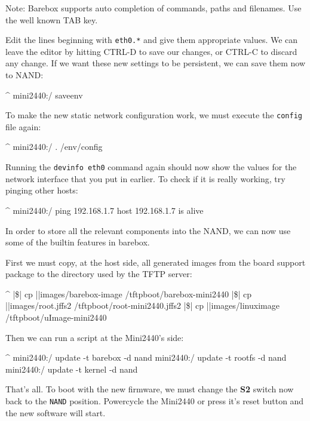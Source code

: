 Note: Barebox supports auto completion of commands, paths and filenames. Use
the well known TAB key.

Edit the lines beginning with \texttt{eth0.*} and give them appropriate values.
We can leave the editor by hitting CTRL-D to save our changes, or CTRL-C to
discard any change. If we want these new settings to be persistent, we can save
them now to NAND:

\begin{ptxshell}[escapechar=|]{^}
mini2440:/ saveenv
\end{ptxshell}

To make the new static network configuration work, we must execute the
\texttt{config} file again:

\begin{ptxshell}[escapechar=|]{^}
mini2440:/ . /env/config
\end{ptxshell}

Running the \texttt{devinfo eth0} command again should now show the values for
the network interface that you put in earlier. To check if it is really working,
try pinging other hosts:

\begin{ptxshell}[escapechar=|]{^}
mini2440:/ ping 192.168.1.7
host 192.168.1.7 is alive
\end{ptxshell}

In order to store all the relevant components into the NAND, we can now use
some of the builtin features in barebox.

First we must copy, at the host side, all generated images from the board support
package to the directory used by the TFTP server:

\begin{ptxshell}[escapechar=|]{^}
|\$| cp |\ptxdistPlatformDir |images/barebox-image /tftpboot/barebox-mini2440
|\$| cp |\ptxdistPlatformDir |images/root.jffs2 /tftpboot/root-mini2440.jffs2
|\$| cp |\ptxdistPlatformDir |images/linuximage /tftpboot/uImage-mini2440
\end{ptxshell}

Then we can run a script at the Mini2440's side:

\begin{ptxshell}[escapechar=|]{^}
mini2440:/ update -t barebox -d nand
mini2440:/ update -t rootfs -d nand
mini2440:/ update -t kernel -d nand
\end{ptxshell}

That's all. To boot with the new firmware, we must change the \textbf{S2} switch
now back to the \texttt{NAND} position. Powercycle the Mini2440
or press it's reset button and the new software will start.

%
